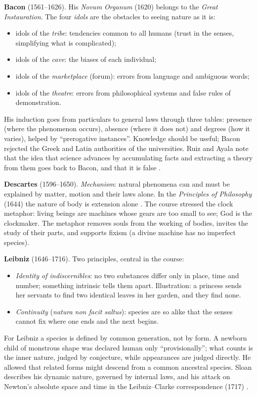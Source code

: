 \textbf{Bacon} (1561--1626). His
\emph{Novum Organum} (1620) belongs to the
\emph{Great Instauration}. The
four \emph{idols} are the obstacles to
seeing nature as it is:
\begin{itemize}
\item idols of the \emph{tribe}: tendencies
common to all humans (trust in the senses,
simplifying what is complicated);
\item idols of the \emph{cave}: the biases
of each individual;
\item idols of the \emph{marketplace}
(forum): errors from language and
ambiguous words;
\item idols of the \emph{theatre}: errors
from philosophical systems and false rules
of demonstration.
\end{itemize}
His induction goes from particulars to
general laws through three tables:
presence (where the phenomenon occurs),
absence (where it does not) and degrees
(how it varies), helped by ``prerogative
instances''. Knowledge should be useful;
Bacon rejected the Greek and Latin
authorities of the universities. Ruiz and
Ayala note that the idea that science
advances by accumulating facts and
extracting a theory from them goes back to
Bacon, and that it is false
\cite[Chapter 3]{ruiz2008metodo}.

\textbf{Descartes} (1596--1650).
\emph{Mechanism}: natural phenomena can and
must be explained by matter, motion and
their laws alone. In the
\emph{Principles of Philosophy} (1644) the
nature of body is extension alone
\cite[Chapter 5]{valor2008cartesiana}. The
course stressed the clock metaphor: living
beings are machines whose gears are too
small to see; God is the clockmaker. The
metaphor removes souls from the working of
bodies, invites the study of their parts,
and supports fixism (a divine machine has
no imperfect species).

\textbf{Leibniz} (1646--1716). Two
principles, central in the course:
\begin{itemize}
\item \emph{Identity of indiscernibles}: no
two substances differ only in place, time
and number; something intrinsic tells them
apart. Illustration: a princess sends her
servants to find two identical leaves in
her garden, and they find none.
\item \emph{Continuity} (\emph{natura non
facit saltus}): species are so alike that
the senses cannot fix where one ends and
the next begins.
\end{itemize}
For Leibniz a species is defined by common
generation, not by form. A newborn child of
monstrous shape was declared human
only ``provisionally''; what counts is
the inner nature, judged by conjecture,
while appearances are judged directly. He
allowed that related forms might descend
from a common ancestral species. Sloan
describes his dynamic nature, governed by
internal laws, and his attack on Newton's
absolute space and time in the
Leibniz--Clarke correspondence (1717)
\cite{sloan-natural-history}.

